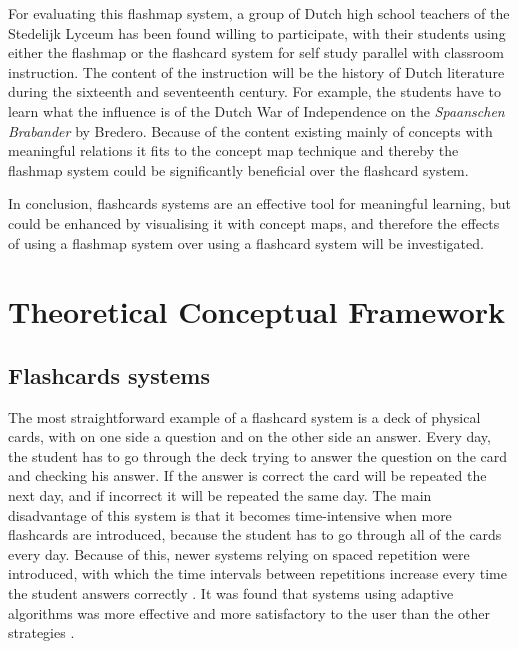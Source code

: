 \documentclass[11pt,twoside]{report} %
\begin{document}
For evaluating this flashmap system, a group of Dutch high school teachers of the Stedelijk Lyceum has been found willing to participate, with their students using either the flashmap or the flashcard system for self study parallel with classroom instruction. The content of the instruction will be the history of Dutch literature during the sixteenth and seventeenth century. For example, the students have to learn what the influence is of the Dutch War of Independence on the \emph{Spaanschen Brabander} by Bredero. Because of the content existing mainly of concepts with meaningful relations it fits to the concept map technique and thereby the flashmap system could be significantly beneficial over the flashcard system.


In conclusion, flashcards systems are an effective tool for meaningful learning, but could be enhanced by visualising it with concept maps, and therefore the effects of using a flashmap system over using a flashcard system will be investigated. 

\section{Theoretical Conceptual Framework}


\subsection{Flashcards systems}

The most straightforward example of a flashcard system is a deck of physical cards, with on one side a question and on the other side an answer. Every day, the student has to go through the deck trying to answer the question on the card and checking his answer. If the answer is correct the card will be repeated the next day, and if incorrect it will be repeated the same day. The main disadvantage of this system is that it becomes time-intensive when more flashcards are introduced, because the student has to go through all of the cards every day. Because of this, newer systems relying on spaced repetition were introduced, with which the time intervals between repetitions increase every time the student answers correctly . It was found that systems using adaptive algorithms was more effective and more satisfactory to the user than the other strategies \cite{microlearning}.
\end{document}
